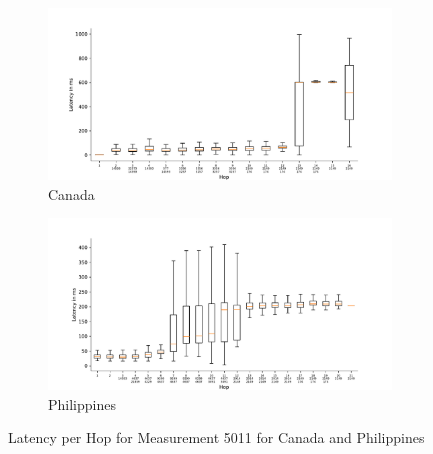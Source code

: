 \begin{figure}
	\centering
	\begin{subfigure}[b]{\linewidth}
		\includegraphics[width=\linewidth]{chapters/4-results/traceroute/img/latency-per-hop-CA-5011.pdf}
		\caption{Canada}
	\end{subfigure}
	\begin{subfigure}[b]{\linewidth}
		\includegraphics[width=\linewidth]{chapters/4-results/traceroute/img/latency-per-hop-PH-5011.pdf}
		\caption{Philippines}
	\end{subfigure}
	\caption{Latency per Hop for Measurement 5011 for Canada and
		Philippines}
	\label{fig:latency-change-per-hop-appendix-9}
\end{figure}

